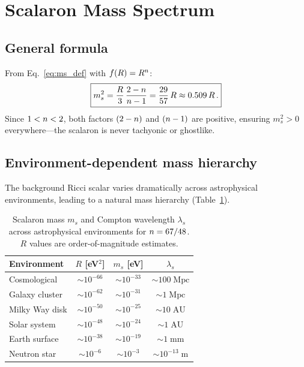 \documentclass[amsmath,amssymb,aps,prd,twocolumn,superscriptaddress,nofootinbib]{revtex4-2}
\begin{document}
\section{Scalaron Mass Spectrum}
\label{sec:mass}

\subsection{General formula}

From Eq.~\eqref{eq:ms_def} with $f(R) = R^{n}$:
\begin{equation}
  \boxed{%
    m_s^2 = \frac{R}{3}\,\frac{2 - \nfR}{\nfR - 1}
          = \frac{29}{57}\,R
          \approx 0.509\,R\,.
  }
  \label{eq:ms_spectrum}
\end{equation}
Since $1 < n < 2$, both factors $(2-n)$ and $(n-1)$ are
positive, ensuring $m_s^2 > 0$ everywhere---the scalaron is
never tachyonic or ghostlike.

\subsection{Environment-dependent mass hierarchy}

The background Ricci scalar varies dramatically across astrophysical
environments, leading to a natural mass hierarchy
(Table~\ref{tab:mass_hierarchy}).

\begin{table}[t]
\centering
\caption{Scalaron mass $m_s$ and Compton wavelength $\lambda_s$
across astrophysical environments for $n = 67/48$.
$R$ values are order-of-magnitude estimates.}
\label{tab:mass_hierarchy}
\begin{tabular}{@{}lccc@{}}
\toprule
Environment & $R$ [eV$^2$]
  & $m_s$ [eV] & $\lambda_s$ \\
\midrule
Cosmological & $\sim 10^{-66}$ & $\sim 10^{-33}$
  & $\sim 100\;\mathrm{Mpc}$ \\
Galaxy cluster & $\sim 10^{-62}$ & $\sim 10^{-31}$
  & $\sim 1\;\mathrm{Mpc}$ \\
Milky Way disk & $\sim 10^{-50}$ & $\sim 10^{-25}$
  & $\sim 10\;\mathrm{AU}$ \\
Solar system & $\sim 10^{-48}$ & $\sim 10^{-24}$
  & $\sim 1\;\mathrm{AU}$ \\
Earth surface & $\sim 10^{-38}$ & $\sim 10^{-19}$
  & $\sim 1\;\mathrm{mm}$ \\
Neutron star & $\sim 10^{-6}$ & $\sim 10^{-3}$
  & $\sim 10^{-13}\;\mathrm{m}$ \\
\bottomrule
\end{tabular}
\end{table}
\end{document}

